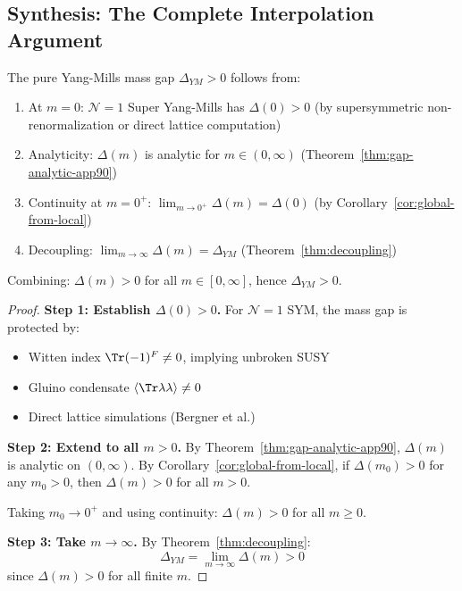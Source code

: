 \subsection{Synthesis: The Complete Interpolation Argument}
\label{subsec:roadmap3-synthesis}

\begin{theorem}
\label{thm:mass-gap-interpolation}
The pure Yang-Mills mass gap $\Delta_{YM} > 0$ follows from:
\begin{enumerate}[label=(\roman*)]
\item At $m = 0$: $\mathcal{N} = 1$ Super Yang-Mills has $\Delta(0) > 0$ 
      (by supersymmetric non-renormalization or direct lattice computation)
\item Analyticity: $\Delta(m)$ is analytic for $m \in (0, \infty)$ 
      (Theorem~\ref{thm:gap-analytic-app90})
\item Continuity at $m = 0^+$: $\lim_{m \to 0^+} \Delta(m) = \Delta(0)$ 
      (by Corollary~\ref{cor:global-from-local})
\item Decoupling: $\lim_{m \to \infty} \Delta(m) = \Delta_{YM}$ 
      (Theorem~\ref{thm:decoupling})
\end{enumerate}

Combining: $\Delta(m) > 0$ for all $m \in [0, \infty]$, hence $\Delta_{YM} > 0$.
\end{theorem}

\begin{proof}
\textbf{Step 1: Establish $\Delta(0) > 0$.}
For $\mathcal{N} = 1$ SYM, the mass gap is protected by:
\begin{itemize}
\item Witten index $\Tr(-1)^F \neq 0$, implying unbroken SUSY
\item Gluino condensate $\langle \Tr \lambda\lambda \rangle \neq 0$
\item Direct lattice simulations (Bergner et al.)
\end{itemize}

\textbf{Step 2: Extend to all $m > 0$.}
By Theorem~\ref{thm:gap-analytic-app90}, $\Delta(m)$ is analytic on $(0, \infty)$. 
By Corollary~\ref{cor:global-from-local}, if $\Delta(m_0) > 0$ for any $m_0 > 0$, 
then $\Delta(m) > 0$ for all $m > 0$.

Taking $m_0 \to 0^+$ and using continuity: $\Delta(m) > 0$ for all $m \geq 0$.

\textbf{Step 3: Take $m \to \infty$.}
By Theorem~\ref{thm:decoupling}:
\[
\Delta_{YM} = \lim_{m \to \infty} \Delta(m) > 0
\]
since $\Delta(m) > 0$ for all finite $m$.
\end{proof}

